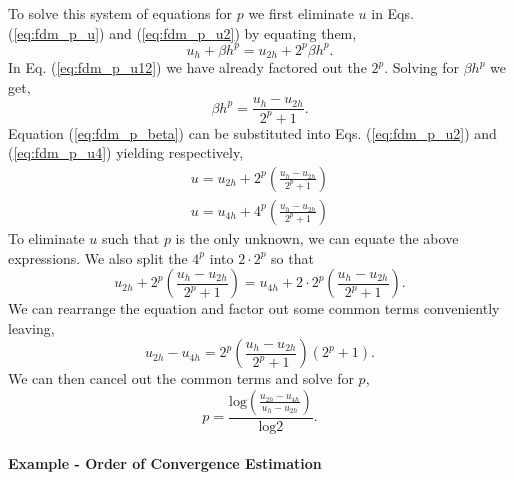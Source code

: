 To solve this system of equations for $p$ we first eliminate $u$ in Eqs. (\ref{eq:fdm_p_u}) and (\ref{eq:fdm_p_u2}) by
equating them,
\begin{equation}
     u_{h} + \beta h^{p} =  u_{2h} + 2^{p}\beta h^{p}.
  \label{eq:fdm_p_u12}
\end{equation}
In Eq. (\ref{eq:fdm_p_u12}) we have already factored out the $2^{p}$.  Solving for $\beta h^{p}$ we get,
\begin{equation}
     \beta h^{p} = \frac{u_{h} - u_{2h}}{2^{p} + 1}.
     \label{eq:fdm_p_beta}
\end{equation}
Equation (\ref{eq:fdm_p_beta}) can be substituted into Eqs. (\ref{eq:fdm_p_u2}) and (\ref{eq:fdm_p_u4}) yielding
respectively,
\begin{eqnarray}
     u = u_{2h} + 2^{p}\left( \frac{u_{h} - u_{2h}}{2^{p} + 1}\right) \\
    u = u_{4h} + 4^{p}\left( \frac{u_{h} - u_{2h}}{2^{p} + 1}\right)
\end{eqnarray}
To eliminate $u$ such that $p$ is the only unknown, we can equate the above expressions. We also split the $4^{p}$ into 
$2\cdot2^{p}$ so that
\begin{equation}
     u_{2h} + 2^{p}\left( \frac{u_{h} - u_{2h}}{2^{p} + 1}\right) = u_{4h} + 
     2\cdot2^{p}\left( \frac{u_{h} - u_{2h}}{2^{p} + 1}\right).
\end{equation} 
We can rearrange the equation and factor out some common terms conveniently leaving,
\begin{equation}
     u_{2h} - u_{4h} = 2^{p}\left( \frac{u_{h} - u_{2h}}{2^{p} + 1}\right)\left(2^{p} + 1\right).
\end{equation}
We can then cancel out the common terms and solve for $p$,
\begin{equation}
     \boxed{p = \frac{\mathrm{log}\left(\frac{u_{2h} - u_{4h}}{u_{h} - u_{2h}}\right)}{\mathrm{log}2}}.
  \label{eq:fdm_order}
\end{equation}

\paragraph{Example - Order of Convergence Estimation}

